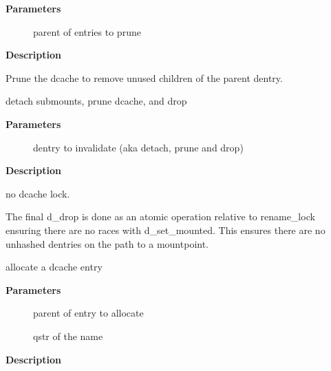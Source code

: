 \documentclass[a4paper,8pt,english]{sphinxmanual}
\begin{document}
\textbf{Parameters}
\begin{description}
\item[{}] \leavevmode
parent of entries to prune

\end{description}

\textbf{Description}

Prune the dcache to remove unused children of the parent dentry.

\begin{fulllineitems}
\label{filesystems/index:c.d_invalidate}
detach submounts, prune dcache, and drop

\end{fulllineitems}


\textbf{Parameters}
\begin{description}
\item[{}] \leavevmode
dentry to invalidate (aka detach, prune and drop)

\end{description}

\textbf{Description}

no dcache lock.

The final d\_drop is done as an atomic operation relative to
rename\_lock ensuring there are no races with d\_set\_mounted.  This
ensures there are no unhashed dentries on the path to a mountpoint.

\begin{fulllineitems}
\label{filesystems/index:c.d_alloc}
allocate a dcache entry

\end{fulllineitems}


\textbf{Parameters}
\begin{description}
\item[{}] \leavevmode
parent of entry to allocate

\item[{}] \leavevmode
qstr of the name

\end{description}

\textbf{Description}
\end{document}
